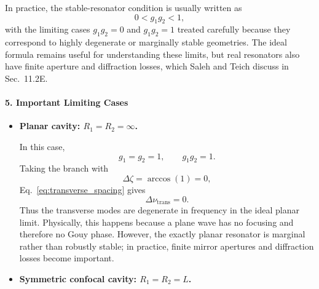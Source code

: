 \begin{resolucao}[Solution]
        In practice, the stable-resonator condition is usually written as
        \begin{equation}
            0<g_1g_2<1,
            \label{eq:stability_condition_practical}
        \end{equation}
        with the limiting cases $g_1g_2=0$ and $g_1g_2=1$ treated carefully because they correspond to highly degenerate or marginally stable geometries. The ideal formula remains useful for understanding these limits, but real resonators also have finite aperture and diffraction losses, which Saleh and Teich discuss in Sec.~11.2E.

    \paragraph*{5. Important Limiting Cases}

        \begin{itemize}
            \item \textbf{Planar cavity: $R_1=R_2=\infty$.}

            In this case,
            \begin{equation}
                g_1=g_2=1,
                \qquad
                g_1g_2=1.
            \end{equation}
            Taking the branch with
            \[
                \Delta\zeta=\arccos(1)=0,
            \]
            Eq.~\eqref{eq:transverse_spacing} gives
            \begin{equation}
                \Delta\nu_{\mathrm{trans}}=0.
            \end{equation}
            Thus the transverse modes are degenerate in frequency in the ideal planar limit. Physically, this happens because a plane wave has no focusing and therefore no Gouy phase. However, the exactly planar resonator is marginal rather than robustly stable; in practice, finite mirror apertures and diffraction losses become important.

            \item \textbf{Symmetric confocal cavity: $R_1=R_2=L$.}


\end{itemize}
\end{resolucao}
